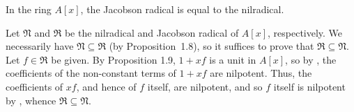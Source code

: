 \begin{exercise}
In the ring \(A[x]\), the Jacobson radical is equal to the nilradical.
\end{exercise}

\begin{solution}
Let \(\mathfrak{N}\) and \(\mathfrak{R}\) be the nilradical and Jacobson radical of \(A[x]\), respectively.
We necessarily have \(\mathfrak{N} \subseteq \mathfrak{R}\) (by Proposition~1.8), so it suffices to prove that \(\mathfrak{R} \subseteq \mathfrak{N}\).
Let \(f \in \mathfrak R\) be given.
By Proposition 1.9, \(1 + x f\) is a unit in \(A[x]\), so by , the coefficients of the non-constant terms of \(1 + x f\) are nilpotent.
Thus, the coefficients of \(x f\), and hence of \(f\) itself, are nilpotent, and so \(f\) itself is nilpotent by , whence \(\mathfrak R \subseteq \mathfrak N\).
\end{solution}